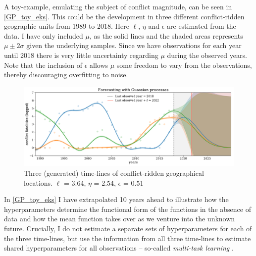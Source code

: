 \documentclass[a4paper]{article}
\begin{document}
A toy-example, emulating the subject of conflict magnitude, can be seen in \autoref{GP_toy_eks}. This could be the development in three different conflict-ridden geographic units from 1989 to 2018. Here $\ell$, $\eta$ and $\epsilon$ are estimated from the data. I have only included $\mu$, as the solid lines and the shaded areas represents $\mu \pm 2\sigma$ given the underlying samples. Since we have observations for each year until 2018 there is very little uncertainty regarding $\mu$ during the observed years. Note that the inclusion of $\epsilon$ allows $\mu$ some freedom to vary from the observations, thereby discouraging overfitting to noise.\par

\begin{figure}[!htb]
	\centering
	\includegraphics[scale=0.47]{GP_toy_eks.pdf}
    \caption{\footnotesize{Three (generated) time-lines of conflict-ridden geographical locations. $\ell$ = 3.64, $\eta$ = 2.54, $\epsilon$ = 0.51}\label{GP_toy_eks}}
\end{figure}%

In \autoref{GP_toy_eks} I have extrapolated 10 years ahead to illustrate how the hyperparameters determine the functional form of the functions in the absence of data and how the mean function takes over as we venture into the unknown future. Crucially, I do not estimate a separate sets of hyperparameters for each of the three time-lines, but use the information from all three time-lines to estimate shared hyperparameters for all observations -- so-called \emph{multi-task learning} \cite[115]{williams2006gaussian}.\par
\end{document}
